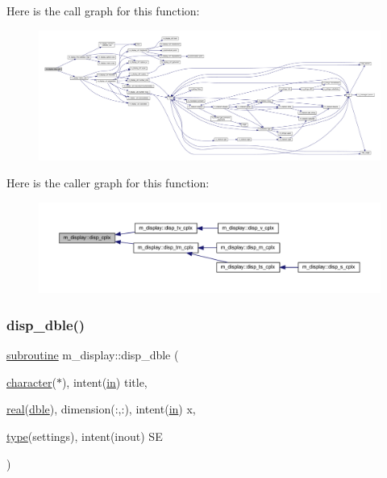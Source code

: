 Here is the call graph for this function\+:
\nopagebreak
\begin{figure}[H]
\begin{center}
\leavevmode
\includegraphics[width=350pt]{namespacem__display_ae6588ffe4d1d6d1022c0b0017f4f70b7_cgraph}
\end{center}
\end{figure}
Here is the caller graph for this function\+:
\nopagebreak
\begin{figure}[H]
\begin{center}
\leavevmode
\includegraphics[width=350pt]{namespacem__display_ae6588ffe4d1d6d1022c0b0017f4f70b7_icgraph}
\end{center}
\end{figure}
\mbox{\label{namespacem__display_a2d67bfdaf90a1173d8283050594c8efa}} 
\subsubsection{\texorpdfstring{disp\+\_\+dble()}{disp\_dble()}}
{\footnotesize\ttfamily \hyperlink{M__stopwatch_83_8txt_acfbcff50169d691ff02d4a123ed70482}{subroutine} m\+\_\+display\+::disp\+\_\+dble (\begin{DoxyParamCaption}\item[{\hyperlink{option__stopwatch_83_8txt_abd4b21fbbd175834027b5224bfe97e66}{character}($\ast$), intent(\hyperlink{M__journal_83_8txt_afce72651d1eed785a2132bee863b2f38}{in})}]{title,  }\item[{\hyperlink{read__watch_83_8txt_abdb62bde002f38ef75f810d3a905a823}{real}(\hyperlink{namespacem__display_a46d90b75b6ccef7ccade133e5847e815}{dble}), dimension(\+:,\+:), intent(\hyperlink{M__journal_83_8txt_afce72651d1eed785a2132bee863b2f38}{in})}]{x,  }\item[{\hyperlink{stop__watch_83_8txt_a70f0ead91c32e25323c03265aa302c1c}{type}(settings), intent(inout)}]{SE }\end{DoxyParamCaption})\hspace{0.3cm}{\ttfamily [private]}}



